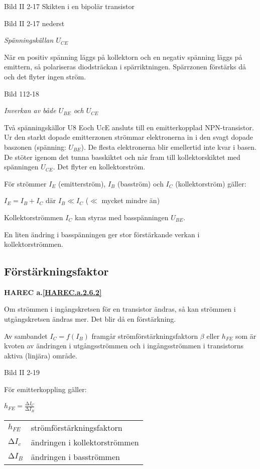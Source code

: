 Bild II 2-17 Skikten i en bipolär transistor

Bild II 2-17 nederst

\emph{Spänningskällan \(U_{CE}\)}

När en positiv spänning läggs på kollektorn och en negativ spänning läggs på
emittern, så polariseras diodsträckan i spärriktningen. Spärrzonen förstärks då
och det flyter ingen ström.

Bild 112-18

\emph{Inverkan av både \(U_{BE}\) och \(U_{CE}\)}

Två spänningskällor U8 Eoch UcE ansluts till en emitterkopplad NPN-transistor.
Ur den starkt dopade emitterzonen strömmar elektronerna in i den svagt dopade
baszonen (spänning: \(U_{BE}\)). De flesta elektronerna blir emellertid inte
kvar i basen. De stöter igenom det tunna basskiktet och når fram till
kollektorskiktet med spänningen \(U_{CE}\). Det flyter en kollektorström.

För strömmer \(I_E\) (emitterström), \(I_B\) (basström) och \(I_C\)
(kollektorström) gäller:

\(I_E = I_B + I_C\) där \(I_B \ll I_C\) (\(\ll\) mycket mindre än)

Kollektorströmmen \(I_C\) kan styras med basspänningen \(U_{BE}\).

En liten ändring i basspänningen ger stor förstärkande verkan i
kollektorströmmen.

\subsection{Förstärkningsfaktor}
\textbf{HAREC a.\ref{HAREC.a.2.6.2}\label{myHAREC.a.2.6.2}}

Om strömmen i ingångskretsen för en transistor ändras, så kan strömmen i
utgångskretsen ändras mer. Det blir då en förstärkning.

Av sambandet \(I_C = f(I_B)\) framgår strömförstärkningsfaktorn \(\beta\) eller
\(h_{FE}\) som är kvoten av ändringen i utgångsströmmen och i ingångsströmmen i
transistorns aktiva (linjära) område.

Bild II 2-19

För emitterkoppling gäller:

\(h_{FE} = \frac{∆I_C}{∆I_B}\)

\begin{tabular}{ll}
  \(h_{FE}\) & strömförstärkningsfaktorn \\
  \(∆I_c\)   & ändringen i kollektorströmmen \\
  \(∆I_B\)   & ändringen i basströmmen \\
\end{tabular}

